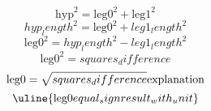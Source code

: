 \[\text{{{hyp}}}^{{2}}=\text{{{leg0}}}^{{2}}+\text{{{leg1}}}^{{2}}\]
\[{hyp_length}^{{2}}=\text{{{leg0}}}^{{2}}+{leg1_length}^{{2}}\]
\[\text{{{leg0}}}^{{2}}={hyp_length}^{{2}}-{leg1_length}^{{2}}\]
\[\text{{{leg0}}}^{{2}}={squares_difference}\]
\[\text{{{leg0}}}=\sqrt{{\mathstrut {squares_difference}}}\text{{{explanation}}}\]
\[\uline{{\text{{{leg0}}}{equal_sign}{result_with_unit}}}\]